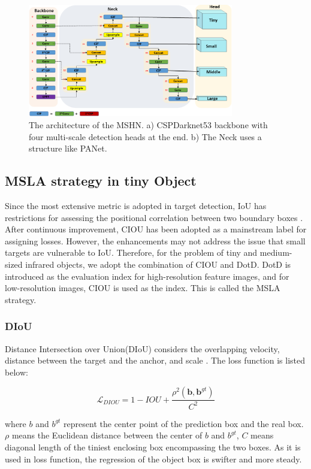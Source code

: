 \documentclass[journal]{IEEEtran}
\begin{document}
\begin{figure}[!t]
    \centering
    \includegraphics[width=0.8\textwidth]{Net}
    \caption {The architecture of the MSHN. a) CSPDarknet53 backbone with four multi-scale detection heads at the end. b) The Neck uses a structure like PANet.}

    \label{fig: Net}
\end{figure}

\subsection{MSLA strategy in tiny Object}
Since the most extensive metric is adopted in target detection, IoU has restrictions for assessing the positional correlation between two boundary boxes \cite{xu2021dot}. After continuous improvement, CIOU has been adopted as a mainstream label for assigning losses. However, the enhancements may not address the issue that small targets are vulnerable to IoU. Therefore, for the problem of  tiny and medium-sized infrared objects, we adopt the combination of CIOU and DotD. DotD is introduced as the evaluation index for high-resolution feature images, and for low-resolution images, CIOU is used as the index. This is called the MSLA strategy.

\subsubsection{DIoU}
Distance Intersection over Union(DIoU) considers the overlapping velocity,  distance between the target and the anchor, and scale \cite{zheng2019distanceiou}. The loss function is listed below:
\begin{center} %
\begin{equation}
\mathcal{L}_{D I O U}=1-I O U+\frac{\rho^2\left(\mathbf{b}, \mathbf{b}^{g t}\right)}{C^2}
\end{equation}
\end{center}
where $b$ and $b^{g t}$ represent the center point of the prediction box and the real box. $\rho$ means the Euclidean distance between the center of $b$ and $b^{g t}$, $C$  means diagonal length of the tiniest enclosing box encompassing the two boxes. As it is used in loss function, the regression of the object box is swifter and more steady. 
\end{document}
